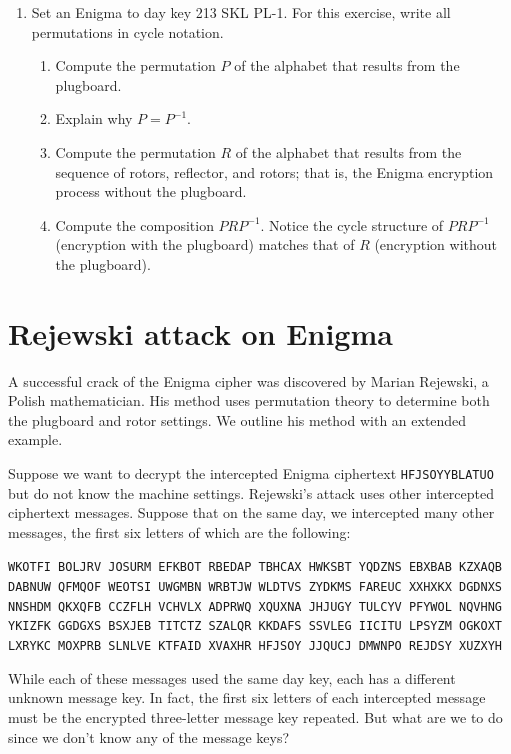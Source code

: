 \documentclass{book}
\theoremstyle{plain}
\theoremstyle{definition}
\newif\ifprintsolutions
\newcommand{\solution}[1]{\ifprintsolutions \begin{sloppypar}{\it #1}\end{sloppypar} \fi} %
\newcommand{\ciphertext}[1]{\texttt{#1}} %
\newcommand{\display}[1]{\begin{sloppypar}\setlength{\parindent}{0mm}#1\end{sloppypar}} %
\begin{document}
\begin{enumerate}
\begin{enumerate}
\end{enumerate}
\item Set an Enigma to day key 213 SKL PL-1. For this exercise, write all permutations in cycle notation.
\begin{enumerate}
\item Compute the permutation $P$ of the alphabet that results from the plugboard. \solution{$P = (AW)(B)(C)(D)(EK)(F)(GY)(H)(IP)(J)(L)(MO)(N)(Q)(R)(S)(T)(U)(V)(X)(Z)$}
\item Explain why $P = P^{-1}$. \solution{The permutation $P$ consists of cycles containing only one or two letters.}
\item Compute the permutation $R$ of the alphabet that results from the sequence of rotors, reflector, and rotors; that is, the Enigma encryption process without the plugboard. \solution{$R = (AS)(BU)(CO)(DH)(EK)(FN)(GM)(IQ)(JV)(LR)(PY)(TZ)(WX)$}
\item Compute the composition $PRP^{-1}$. Notice the cycle structure of $PRP^{-1}$ (encryption with the plugboard) matches that of $R$ (encryption without the plugboard). \solution{$PRP^{-1} = (AX)(BU)(CM)(DH)(EK)(FN)(GI)(JV)(LR)(OY)(PQ)(SW)(TZ)$}
\end{enumerate}
\end{enumerate}

\chapter{Rejewski attack on Enigma}
A successful crack of the Enigma cipher was discovered by Marian Rejewski, a Polish mathematician. His method uses permutation theory to determine both the plugboard and rotor settings. We outline his method with an extended example.

Suppose we want to decrypt the intercepted Enigma ciphertext \ciphertext{HFJSOYYBLATUO} but do not know the machine settings. Rejewski's attack uses other intercepted ciphertext messages. Suppose that on the same day, we intercepted many other messages, the first six letters of which are the following: \display{\ciphertext{WKOTFI BOLJRV JOSURM EFKBOT RBEDAP TBHCAX HWKSBT YQDZNS EBXBAB KZXAQB DABNUW QFMQOF WEOTSI UWGMBN WRBTJW WLDTVS ZYDKMS FAREUC XXHXKX DGDNXS NNSHDM QKXQFB CCZFLH VCHVLX ADPRWQ XQUXNA JHJUGY TULCYV PFYWOL NQVHNG YKIZFK GGDGXS BSXJEB TITCTZ SZALQR KKDAFS SSVLEG IICITU LPSYZM OGKOXT LXRYKC MOXPRB SLNLVE KTFAID XVAXHR HFJSOY JJQUCJ DMWNPO REJDSY XUZXYH}}

While each of these messages used the same day key, each has a different unknown message key. In fact, the first six letters of each intercepted message must be the encrypted three-letter message key repeated. But what are we to do since we don't know any of the message keys?
\end{document}
